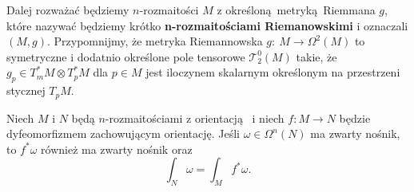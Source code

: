 
%    



Dalej rozważać będziemy \(n\)-rozmaitości \(M\) z określoną metryką Riemmana \(g\), które nazywać będziemy krótko \textbf{n-rozmaitościami Riemanowskimi} i oznaczali \((M, g)\). Przypomnijmy, że metryka Riemannowska \(g:\: M \rightarrow \Omega^2(M)\) to symetryczne i dodatnio określone pole tensorowe \(\mathcal{T}_2^0(M)\) takie, że \(g_p \in T_m^{\ast} M \otimes T_p^{\ast} M\) dla \(p\in M\) jest iloczynem skalarnym określonym na przestrzeni stycznej \(T_p M\).  

\begin{twierdzenie}
    Niech \(M\) i \(N\) będą \(n\)-rozmaitościami z orientacją  i niech \(f: M\to N\) będzie dyfeomorfizmem zachowującym orientację. Jeśli \(\omega \in \Omega^n(N)\) ma zwarty nośnik, to \(f^\ast\omega\) również ma zwarty nośnik oraz
    \begin{equation}\label{eq:zamiana zmiennych}
        \int_N \omega = \int_M f^\ast \omega.
    \end{equation}
\end{twierdzenie}

